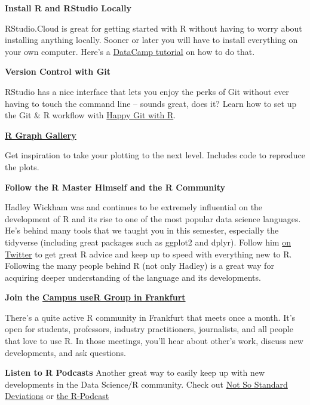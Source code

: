 \documentclass[
  11pt,
]{article}
\newenvironment{tips}[1]
  {
  \begin{itemize}
  \footnotesize
  \renewcommand{\labelitemi}{
    \raisebox{-.7\height}[0pt][0pt]{
      {\setkeys{Gin}{width=3em,keepaspectratio}
        \texttt{[image: images/\#1.png]}}
    }
  }
  \setlength{\fboxsep}{1em}
  \begin{rbox}
  \item
  }
  {
  \end{rbox}
  \end{itemize}
  }
\begin{document}
\begin{tips}r

\textbf{Install R and RStudio Locally}

RStudio.Cloud is great for getting started with R without having to worry about installing anything locally. Sooner or later you will have to install everything on your own computer. Here's a \href{https://www.datacamp.com/community/tutorials/installing-R-windows-mac-ubuntu}{DataCamp tutorial} on how to do that.

\textbf{Version Control with Git}

RStudio has a nice interface that lets you enjoy the perks of Git without ever having to touch the command line -- sounds great, does it? Learn how to set up the Git \& R workflow with \href{https://happygitwithr.com/}{Happy Git with R}.

\textbf{\href{https://www.r-graph-gallery.com/}{R Graph Gallery}}

Get inspiration to take your plotting to the next level. Includes code to reproduce the plots.

\textbf{Follow the R Master Himself and the R Community}

Hadley Wickham was and continues to be extremely influential on the development of R and its rise to one of the most popular data science languages. He's behind many tools that we taught you in this semester, especially the tidyverse (including great packages such as ggplot2 and dplyr). Follow him \href{https://twitter.com/hadleywickham}{on Twitter} to get great R advice and keep up to speed with everything new to R. Following the many people behind R (not only Hadley) is a great way for acquiring deeper understanding of the language and its developments.

\textbf{Join the \href{https://www.meetup.com/r-frankfurt/}{Campus useR Group in Frankfurt}}

There's a quite active R community in Frankfurt that meets once a month. It's open for students, professors, industry practitioners, journalists, and all people that love to use R. In those meetings, you'll hear about other's work, discuss new developments, and ask questions.

\textbf{Listen to R Podcasts}
Another great way to easily keep up with new developments in the Data Science/R community. Check out
\href{http://nssdeviations.com/}{Not So Standard Deviations} or \href{https://r-podcast.org/}{the R-Podcast}

\end{tips}
\end{document}
